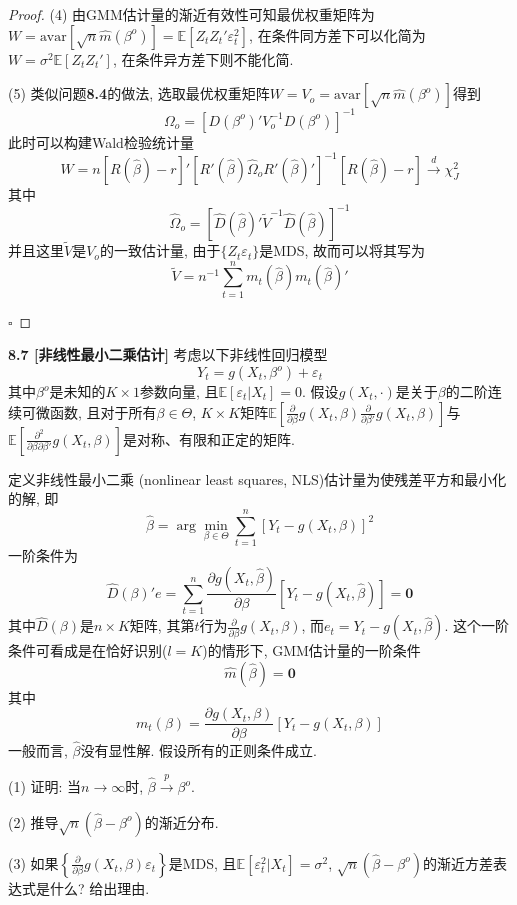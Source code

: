 \documentclass[cn,12pt,math=mtpro2,citestyle=gb7714-2015,bibstyle=gb7714-2015,twocol,mode=simple]{elegantbook}
\newcommand{\E}{\mathbb{E}}
\newcommand{\hbeta}{\hat{\beta}}
\newcommand{\hatm}{\hat{m}}
\begin{document}
\begin{proof}
     (4) 由GMM估计量的渐近有效性可知最优权重矩阵为$W=\text{avar}[\sqrt{n}\hat{m}(\beta^o)]=\E[Z_tZ_t'\varepsilon_t^2]$, 在条件同方差下可以化简为$W=\sigma^2\E[Z_tZ_t']$, 在条件异方差下则不能化简.

     (5) 类似问题\textbf{8.4}的做法, 选取最优权重矩阵$W=V_o=\text{avar}[\sqrt{n}\hatm(\beta^o)]$得到
     $$\Omega_o=[D(\beta^o)'V_o^{-1}D(\beta^o)]^{-1}$$
     此时可以构建Wald检验统计量
     $$W=n[R(\hbeta)-r]'[R'(\hbeta)\hat{\Omega}_oR'(\hbeta)']^{-1}[R(\hbeta)-r]\xrightarrow{d}\chi_J^2$$
     其中
     $$\hat{\Omega}_o=[\hat{D}(\hat{\beta})'\tilde{V}^{-1}\hat{D}(\hat{\beta})]^{-1}$$
     并且这里$\tilde{V}$是$V_o$的一致估计量, 由于$\{Z_t\varepsilon_t\}$是MDS, 故而可以将其写为
     $$\tilde{V}=n^{-1}\sum_{t=1}^{n}m_t(\hbeta)m_t(\hbeta)'$$

     $\square$
   \end{proof}

   \textbf{8.7 [非线性最小二乘估计]} 考虑以下非线性回归模型
   $$Y_t=g(X_t,\beta^o)+\varepsilon_t$$
   其中$\beta^o$是未知的$K\times1$参数向量, 且$\E[\varepsilon_t|X_t]=0$. 假设$g(X_t,\cdot)$是关于$\beta$的二阶连续可微函数, 且对于所有$\beta\in\Theta$, $K\times K$矩阵$\displaystyle\E\left[\frac{\partial}{\partial \beta}g(X_t,\beta)\frac{\partial}{\partial \beta'}g(X_t,\beta)\right]$与$\displaystyle\E\left[\frac{\partial^2}{\partial\beta\partial\beta'}g(X_t,\beta)\right]$是对称、有限和正定的矩阵.

   定义非线性最小二乘 (nonlinear least squares, NLS)估计量为使残差平方和最小化的解, 即
   $$\hat{\beta}=\arg\min_{\beta\in\Theta}\sum_{t=1}^{n}[Y_t-g(X_t,\beta)]^2$$
   一阶条件为
   $$\hat{D}(\beta)'e=\sum_{t=1}^{n}\frac{\partial g(X_t,\hbeta)}{\partial\beta}[Y_t-g(X_t,\hat{\beta})]=\mathbf{0}$$
   其中$\hat{D}(\beta)$是$n\times K$矩阵, 其第$t$行为$\displaystyle\frac{\partial}{\partial \beta}g(X_t,\beta)$, 而$e_t=Y_t-g(X_t,\hbeta)$. 这个一阶条件可看成是在恰好识别($l=K$)的情形下, GMM估计量的一阶条件
   $$\hat{m}(\hat{\beta})=\mathbf{0}$$
   其中
   $$m_t(\beta)=\frac{\partial g(X_t,\beta)}{\partial \beta}[Y_t-g(X_t,\beta)]$$
   一般而言, $\hbeta$没有显性解. 假设所有的正则条件成立.

  (1) 证明: 当$n\to\infty$时, $\hat{\beta}\xrightarrow{p}\beta^o$.

  (2) 推导$\sqrt{n}(\hbeta-\beta^o)$的渐近分布.

  (3) 如果$\displaystyle\left\{\frac{\partial}{\partial\beta}g(X_t,\beta)\varepsilon_t\right\}$是MDS, 且$\E[\varepsilon_t^2|X_t]=\sigma^2$, $\sqrt{n}(\hat{\beta}-\beta^o)$的渐近方差表达式是什么? 给出理由.
\end{document}
